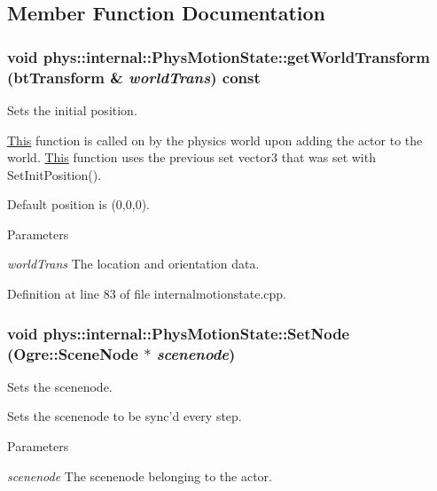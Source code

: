 \subsection{Member Function Documentation}
\hypertarget{classphys_1_1internal_1_1PhysMotionState_a8daeae588d49f07da6c6dfec83de45c3}{
\subsubsection[{getWorldTransform}]{\setlength{\rightskip}{0pt plus 5cm}void phys::internal::PhysMotionState::getWorldTransform (btTransform \& {\em worldTrans}) const}}
\label{dc/df8/classphys_1_1internal_1_1PhysMotionState_a8daeae588d49f07da6c6dfec83de45c3}


Sets the initial position. 

\hyperlink{structThis}{This} function is called on by the physics world upon adding the actor to the world. \hyperlink{structThis}{This} function uses the previous set vector3 that was set with SetInitPosition(). \par
 Default position is (0,0,0). 
\begin{DoxyParams}{Parameters}
\item[{\em worldTrans}]The location and orientation data. \end{DoxyParams}


Definition at line 83 of file internalmotionstate.cpp.

\hypertarget{classphys_1_1internal_1_1PhysMotionState_a22ca36a454168e74f73d297c9747d86a}{
\subsubsection[{SetNode}]{\setlength{\rightskip}{0pt plus 5cm}void phys::internal::PhysMotionState::SetNode (Ogre::SceneNode $\ast$ {\em scenenode})}}
\label{dc/df8/classphys_1_1internal_1_1PhysMotionState_a22ca36a454168e74f73d297c9747d86a}


Sets the scenenode. 

Sets the scenenode to be sync'd every step. 
\begin{DoxyParams}{Parameters}
\item[{\em scenenode}]The scenenode belonging to the actor. \end{DoxyParams}



